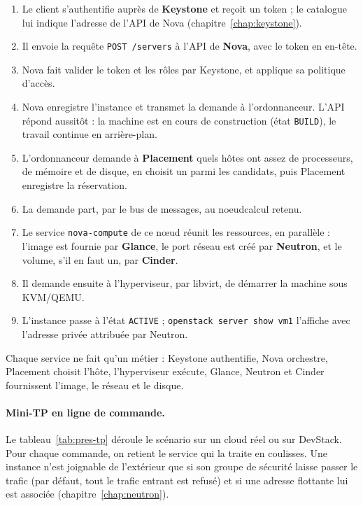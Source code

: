 \begin{enumerate}[label=\textcolor{insarouge}{\bfseries\arabic*.}, nosep, leftmargin=*]
  \item Le client s'authentifie auprès de \textbf{Keystone} et reçoit un token ; le catalogue lui indique l'adresse de l'API de Nova
        (chapitre~\ref{chap:keystone}).
  \item Il envoie la requête \texttt{POST /servers} à l'API de \textbf{Nova}, avec le token en en-tête.
  \item Nova fait valider le token et les rôles par Keystone, et applique sa politique d'accès.
  \item Nova enregistre l'instance et transmet la demande à l'\gls{ordonnanceur}. L'API répond aussitôt : la machine est en cours de
        construction (état \texttt{BUILD}), le travail continue en arrière-plan.
  \item L'ordonnanceur demande à \textbf{Placement} quels hôtes ont assez de processeurs, de mémoire et de disque, en choisit un parmi les
        candidats, puis Placement enregistre la réservation.
  \item La demande part, par le bus de messages, au \gls{noeudcalcul} retenu.
  \item Le service \texttt{nova-compute} de ce nœud réunit les ressources, en parallèle : l'image est fournie par \textbf{Glance}, le port
        réseau est créé par \textbf{Neutron}, et le volume, s'il en faut un, par \textbf{Cinder}.
  \item Il demande ensuite à l'hyperviseur, par \gls{libvirt}, de démarrer la machine sous KVM/QEMU.
  \item L'instance passe à l'état \texttt{ACTIVE} ; \texttt{openstack server show vm1} l'affiche avec l'adresse privée attribuée par Neutron.
\end{enumerate}

\begin{pointcle}
Chaque service ne fait qu'un métier : Keystone authentifie, Nova orchestre, Placement choisit l'hôte, l'hyperviseur exécute, Glance,
Neutron et Cinder fournissent l'image, le réseau et le disque.
\end{pointcle}

\paragraph{Mini-TP en ligne de commande.} Le tableau~\ref{tab:pres-tp} déroule le scénario sur un cloud réel ou sur DevStack. Pour
chaque commande, on retient le service qui la traite en coulisses. Une instance n'est joignable de l'extérieur que si son groupe de
sécurité laisse passer le trafic (par défaut, tout le trafic entrant est refusé) et si une adresse flottante lui est associée
(chapitre~\ref{chap:neutron}).


